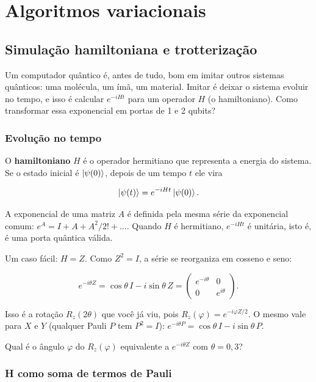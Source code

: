 \providecommand{\tightlist}{\setlength{\itemsep}{0pt}\setlength{\parskip}{0pt}}
\newpage
\section{Algoritmos variacionais}
\subsection{Simulação hamiltoniana e trotterização}
Um computador quântico é, antes de tudo, bom em imitar outros sistemas quânticos: uma molécula, um ímã, um material. Imitar é deixar o sistema evoluir no tempo, e isso é calcular \(e^{-iHt}\) para um operador \(H\) (o hamiltoniano). Como transformar essa exponencial em portas de 1 e 2 qubits?

\subsubsection{Evolução no tempo}\label{evoluuxe7uxe3o-no-tempo}

O \textbf{hamiltoniano} \(H\) é o operador hermitiano que representa a energia do sistema. Se o estado inicial é \(\left|{\psi(0)}\right>\), depois de um tempo \(t\) ele vira

\[
\left|{\psi(t)}\right> = e^{-iHt}\left|{\psi(0)}\right>.
\]

A exponencial de uma matriz \(A\) é definida pela mesma série da exponencial comum: \(e^{A} = I + A + A^2/2! + \dots\). Quando \(H\) é hermitiano, \(e^{-iHt}\) é unitária, isto é, é uma porta quântica válida.

Um caso fácil: \(H = Z\). Como \(Z^2 = I\), a série se reorganiza em cosseno e seno:

\[
e^{-i\theta Z} = \cos\theta\, I - i\sin\theta\, Z = \begin{pmatrix} e^{-i\theta} & 0 \\ 0 & e^{i\theta}\end{pmatrix}.
\]

Isso é a rotação \(R_z(2\theta)\) que você já viu, pois \(R_z(\varphi) = e^{-i\varphi Z/2}\). O mesmo vale para \(X\) e \(Y\) (qualquer Pauli \(P\) tem \(P^2=I\)): \(e^{-i\theta P} = \cos\theta\,I - i\sin\theta\,P\).

Qual é o ângulo \(\varphi\) do \(R_z(\varphi)\) equivalente a \(e^{-i\theta Z}\) com \(\theta = 0{,}3\)?

\subsubsection{H como soma de termos de Pauli}\label{h-como-soma-de-termos-de-pauli}

